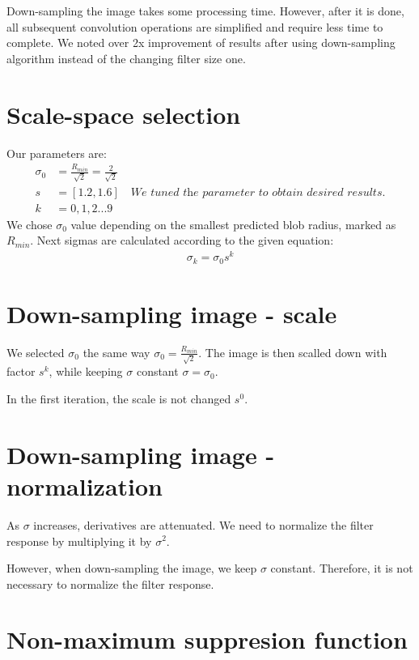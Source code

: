 \documentclass{article}
\begin{document}
Down-sampling the image takes some processing time. However, after it is done, all subsequent convolution operations are simplified and require less time to complete. We noted over 2x improvement of results after using down-sampling algorithm instead of the changing filter size one. 

\section{Scale-space selection}
Our parameters are:
\begin{align*}
\sigma_0&=\frac{R_{min}}{\sqrt{2}}=\frac{2}{\sqrt{2}}\\
s&=[1.2,  1.6] \quad  \textit{We tuned the parameter to obtain desired results.}\\
k&=0,1,2...9
\end{align*}
We chose $\sigma_0$ value depending on the smallest predicted blob radius, marked as $R_{min}$. Next sigmas are calculated according to the given equation:
\begin{align*}
\sigma_k = \sigma_0s^k 
\end{align*}


\section{Down-sampling image - scale}
We selected $\sigma_0$ the same way $\sigma_0=\frac{R_{min}}{\sqrt{2}}$.
The image is then scalled down with factor $s^k$, while keeping $\sigma$ constant $\sigma=\sigma_0$.

In the first iteration, the scale is not changed $s^0$.

\section{Down-sampling image - normalization}
As $\sigma$ increases, derivatives are attenuated. We need to normalize the filter response by multiplying it by $\sigma^2$.

However, when down-sampling the image, we keep $\sigma$ constant. Therefore, it is not necessary to normalize the filter response.



\section{Non-maximum suppresion function}
\end{document}
